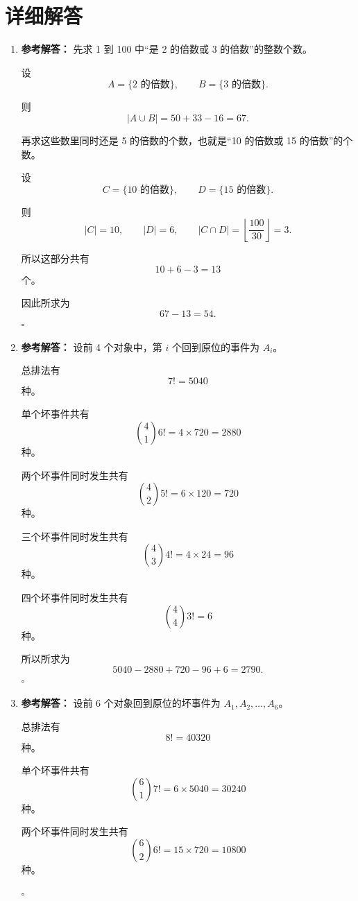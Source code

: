 \documentclass[11pt,a4paper,fontset=fandol]{ctexart}
\newenvironment{solution}{\par\noindent\textbf{参考解答：}}{\hfill$\square$\par}
\begin{document}
\newpage
\section{详细解答}

\begin{enumerate}
  \item \begin{solution}
  先求 1 到 100 中“是 2 的倍数或 3 的倍数”的整数个数。

  设
  \[
  A=\{\text{2 的倍数}\},\qquad B=\{\text{3 的倍数}\}.
  \]

  则
  \[
  |A\cup B|=50+33-16=67.
  \]

  再求这些数里同时还是 5 的倍数的个数，也就是“10 的倍数或 15 的倍数”的个数。

  设
  \[
  C=\{\text{10 的倍数}\},\qquad D=\{\text{15 的倍数}\}.
  \]

  则
  \[
  |C|=10,
  \qquad
  |D|=6,
  \qquad
  |C\cap D|=\left\lfloor\frac{100}{30}\right\rfloor=3.
  \]

  所以这部分共有
  \[
  10+6-3=13
  \]
  个。

  因此所求为
  \[
  67-13=54.
  \]
  \end{solution}

  \item \begin{solution}
  设前 4 个对象中，第 $i$ 个回到原位的事件为 $A_i$。

  总排法有
  \[
  7!=5040
  \]
  种。

  单个坏事件共有
  \[
  \binom41 6!=4\times 720=2880
  \]
  种。

  两个坏事件同时发生共有
  \[
  \binom42 5!=6\times 120=720
  \]
  种。

  三个坏事件同时发生共有
  \[
  \binom43 4!=4\times 24=96
  \]
  种。

  四个坏事件同时发生共有
  \[
  \binom44 3!=6
  \]
  种。

  所以所求为
  \[
  5040-2880+720-96+6=2790.
  \]
  \end{solution}

  \item \begin{solution}
  设前 6 个对象回到原位的坏事件为 $A_1,A_2,\ldots,A_6$。

  总排法有
  \[
  8!=40320
  \]
  种。

  单个坏事件共有
  \[
  \binom61 7!=6\times 5040=30240
  \]
  种。

  两个坏事件同时发生共有
  \[
  \binom62 6!=15\times 720=10800
  \]
  种。


\end{solution}
\end{enumerate}
\end{document}
